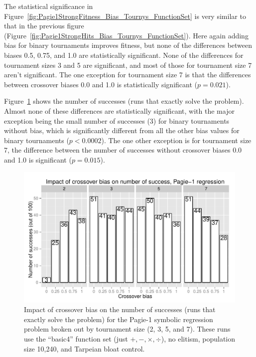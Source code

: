 \documentclass{sig-alternate}
\begin{document}
%
%
%
%

The statistical significance in Figure~\ref{fig:Pagie1StrongFitness_Bias_Tournys_FunctionSet} is very similar to that in 
the previous figure (Figure~\ref{fig:Pagie1StrongHits_Bias_Tournys_FunctionSet}). Here again adding bias for binary 
tournaments improves fitness, but none of the differences between biases 0.5, 0.75, and 1.0 are statistically 
significant. None of the differences for tournament sizes 3 and 5 are significant, and most of those for tournament size 
7 aren't significant. The one exception for tournament size 7 is that the differences between crossover biases 0.0 and 
1.0 is statistically significant ($p = 0.021$).

Figure~\ref{fig:Pagie1StrongSuccesses} shows the number of successes (runs that exactly solve the problem). 
Almost none of these differences are statistically significant, with the major exception being the small number of 
successes (3) for binary tournaments without bias, which is significantly different from all the other bias values for 
binary tournaments ($p<0.0002$). The one other exception is for tournament size 7, the difference between the 
number of successes without crossover biases 0.0 and 1.0 is significant ($p=0.015$).

\begin{figure}
\centering
\includegraphics[width=0.45 \textwidth]{Plots/Pagie_1_Strong_Successes_vs_Bias.pdf}
\caption{Impact of crossover bias on the number of successes (runs that exactly solve the problem) for the 
Pagie-1 symbolic regression problem broken out by tournament size (2, 3, 5, and 7). These runs use the ``basic4'' 
function set (just $+, -, \times, \div$), no elitism, population size 10,240, and Tarpeian bloat control.}
\label{fig:Pagie1StrongSuccesses}
\end{figure}
\end{document}
